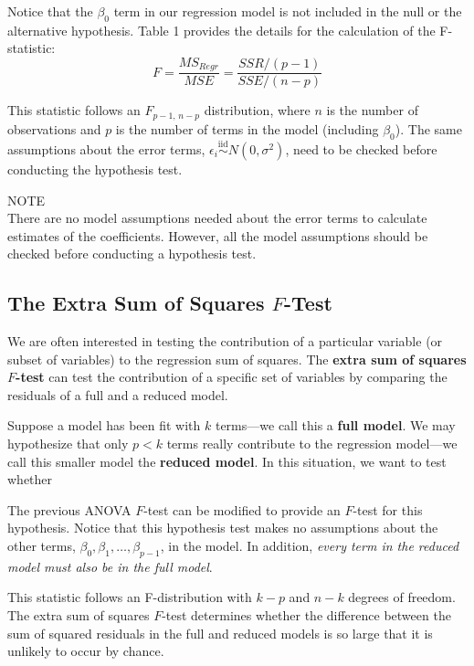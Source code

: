 \documentclass[
]{report}
\begin{document}
Notice that the \(\beta_0\) term in our regression model is not included in the null or the alternative hypothesis. Table 1 provides the details for the calculation of the F-statistic:
\begin{equation}
F = \frac{MS_{Regr}}{MSE}
  = \frac{SSR/(p - 1)}{SSE/(n - p)}
\tag{3.11}
\end{equation}

This statistic follows an \(F_{p-1,\,n-p}\) distribution, where \(n\) is the number of observations and \(p\) is the number of terms in the model (including \(\beta_0\)). The same assumptions about the error terms, \(\epsilon_i \overset{\mathrm{iid}}{\sim}N(0,\sigma^2)\), need to be checked before conducting the hypothesis test.

NOTE\\
There are no model assumptions needed about the error terms to calculate estimates of the coefficients. However, all the model assumptions should be checked before conducting a hypothesis test.

\subsection{\texorpdfstring{The Extra Sum of Squares \(F\)-Test}{The Extra Sum of Squares F-Test}}\label{the-extra-sum-of-squares-f-test}

We are often interested in testing the contribution of a particular variable (or subset of variables) to the regression sum of squares. The \textbf{extra sum of squares \(F\)-test} can test the contribution of a specific set of variables by comparing the residuals of a full and a reduced model.

Suppose a model has been fit with \(k\) terms---we call this a \textbf{full model}. We may hypothesize that only \(p < k\) terms really contribute to the regression model---we call this smaller model the \textbf{reduced model}. In this situation, we want to test whether

The previous ANOVA \(F\)-test can be modified to provide an \(F\)-test for this hypothesis. Notice that this hypothesis test makes no assumptions about the other terms, \(\beta_0, \beta_1, \dots, \beta_{p-1}\), in the model. In addition, \emph{every term in the reduced model must also be in the full model}.

This statistic follows an F-distribution with \(k-p\) and \(n-k\) degrees of freedom. The extra sum of squares \(F\)-test determines whether the difference between the sum of squared residuals in the full and reduced
models is so large that it is unlikely to occur by chance.
\end{document}

